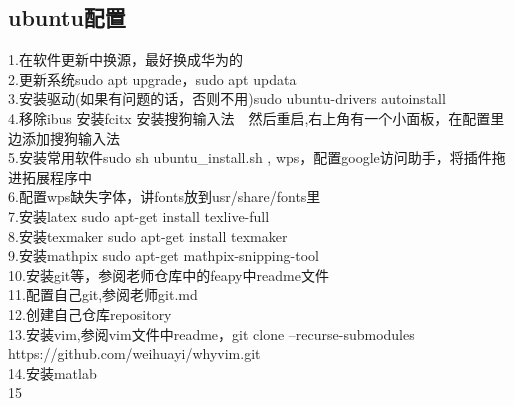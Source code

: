\documentclass[12pt,a4paper]{article}
\begin{document}
	\subsection{ubuntu配置}
	1.在软件更新中换源，最好换成华为的\\
	2.更新系统sudo apt upgrade，sudo apt updata\\
	3.安装驱动(如果有问题的话，否则不用)sudo ubuntu-drivers autoinstall	\\
	4.移除ibus 安装fcitx 安装搜狗输入法　然后重启,右上角有一个小面板，在配置里边添加搜狗输入法\\
	5.安装常用软件sudo sh ubuntu\_install.sh , wps，配置google访问助手，将插件拖进拓展程序中\\
	6.配置wps缺失字体，讲fonts放到usr/share/fonts里\\
	7.安装latex sudo apt-get install texlive-full \\
	8.安装texmaker sudo apt-get install texmaker\\
	9.安装mathpix sudo apt-get mathpix-snipping-tool\\
	10.安装git等，参阅老师仓库中的feapy中readme文件\\
	11.配置自己git,参阅老师git.md\\
	12.创建自己仓库repository\\
	13.安装vim,参阅vim文件中readme，git clone --recurse-submodules https://github.com/weihuayi/whyvim.git\\
	14.安装matlab\\
	15
\end{document}
